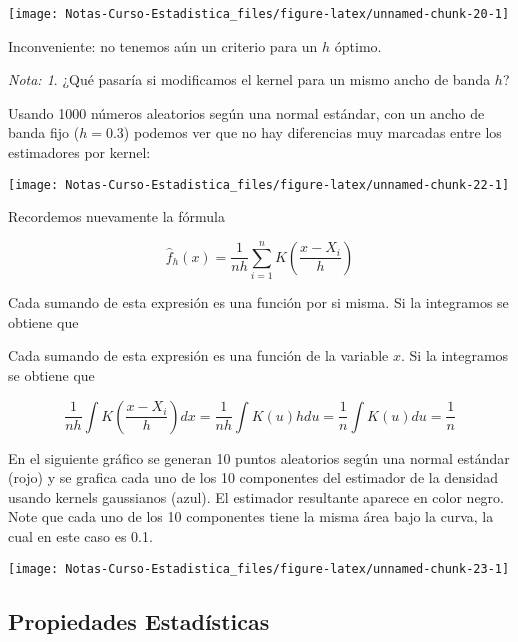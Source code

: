 \documentclass[
  12pt,
]{book}
\theoremstyle{definition}
\theoremstyle{definition}
\theoremstyle{definition}
\theoremstyle{definition}
\theoremstyle{remark}
\newtheorem*{remark}{Nota: }
\begin{document}
\begin{center}\texttt{[image: Notas-Curso-Estadistica\_files/figure-latex/unnamed-chunk-20-1]} \end{center}

Inconveniente: no tenemos aún un criterio para un \(h\) óptimo.

\begin{remark}
¿Qué pasaría si modificamos el kernel para un mismo ancho de banda \(h\)?
\end{remark}

Usando 1000 números aleatorios según una normal estándar, con un ancho de banda fijo (\(h=0.3\)) podemos ver que no hay diferencias muy marcadas entre los estimadores por kernel:

\begin{center}\texttt{[image: Notas-Curso-Estadistica\_files/figure-latex/unnamed-chunk-22-1]} \end{center}

Recordemos nuevamente la fórmula

\begin{equation*}
\hat{f}_{h}\left( x \right) = \frac{1}{nh}\sum_{i=1}^{n} K\left( \frac{x-X_{i}}{h} \right)
\end{equation*}

Cada sumando de esta expresión es una función por si misma. Si la
integramos se obtiene que

Cada sumando de esta expresión es una función de la variable \(x\). Si la integramos se obtiene que

\begin{equation*}
\frac{1}{nh}\int K\left( \frac{x-X_{i}}{h} \right) dx
= \frac{1}{nh} \int K\left( u \right) h du
= \frac{1}{n} \int K(u) du
= \frac{1}{n}
\end{equation*}

En el siguiente gráfico se generan 10 puntos aleatorios según una normal estándar (rojo) y se grafica cada uno de los 10 componentes del estimador de la densidad usando kernels gaussianos (azul). El estimador resultante aparece en color negro. Note que cada uno de los 10 componentes tiene la misma área bajo la curva, la cual en este caso es 0.1.

\begin{center}\texttt{[image: Notas-Curso-Estadistica\_files/figure-latex/unnamed-chunk-23-1]} \end{center}

\hypertarget{propiedades-estaduxedsticas-2}{%
\subsection{Propiedades Estadísticas}\label{propiedades-estaduxedsticas-2}}
\end{document}
